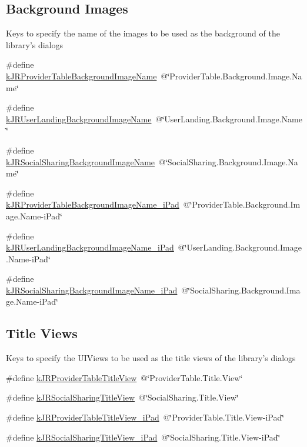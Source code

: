 \subsection*{Background Images}
\label{_amgrp2c0408c2c62eea12966fb29a94739702}
 Keys to specify the name of the images to be used as the background of the library's dialogs \begin{DoxyCompactItemize}
\item 
\#define \hyperlink{group__custom_interface_ga893fb6e20be0c6658e81a6a5d5c121f0}{kJRProviderTableBackgroundImageName}~@\char`\"{}ProviderTable.Background.Image.Name\char`\"{}
\item 
\#define \hyperlink{group__custom_interface_gadda3f945ba5012762eb92764b251b918}{kJRUserLandingBackgroundImageName}~@\char`\"{}UserLanding.Background.Image.Name\char`\"{}
\item 
\#define \hyperlink{group__custom_interface_gad2e00942af19ec9478ba58a491a8b8f2}{kJRSocialSharingBackgroundImageName}~@\char`\"{}SocialSharing.Background.Image.Name\char`\"{}
\item 
\#define \hyperlink{group__custom_interface_ga25b26cff96d8f174f3bdc040031466b7}{kJRProviderTableBackgroundImageName\_\-iPad}~@\char`\"{}ProviderTable.Background.Image.Name-\/iPad\char`\"{}
\item 
\#define \hyperlink{group__custom_interface_ga52b4fb3801cf3fe6e5a294d9a4d1ff0a}{kJRUserLandingBackgroundImageName\_\-iPad}~@\char`\"{}UserLanding.Background.Image.Name-\/iPad\char`\"{}
\item 
\#define \hyperlink{group__custom_interface_ga646cb35f3a7ec2835872ee6df2aceb76}{kJRSocialSharingBackgroundImageName\_\-iPad}~@\char`\"{}SocialSharing.Background.Image.Name-\/iPad\char`\"{}
\end{DoxyCompactItemize}
\subsection*{Title Views}
\label{_amgrp3aa85b42b54fc9202c3d403d77360bef}
 Keys to specify the UIViews to be used as the title views of the library's dialogs \begin{DoxyCompactItemize}
\item 
\#define \hyperlink{group__custom_interface_ga0bce97edf43c9cdf53cbcd1aa92c4798}{kJRProviderTableTitleView}~@\char`\"{}ProviderTable.Title.View\char`\"{}
\item 
\#define \hyperlink{group__custom_interface_ga524965cf426f0eb9de4bcb804528c7f7}{kJRSocialSharingTitleView}~@\char`\"{}SocialSharing.Title.View\char`\"{}
\item 
\#define \hyperlink{group__custom_interface_ga52c322e9fd2aa78cbd64d050f0fd5e41}{kJRProviderTableTitleView\_\-iPad}~@\char`\"{}ProviderTable.Title.View-\/iPad\char`\"{}
\item 
\#define \hyperlink{group__custom_interface_ga2f88062cdd1fd38ad0e800d382450398}{kJRSocialSharingTitleView\_\-iPad}~@\char`\"{}SocialSharing.Title.View-\/iPad\char`\"{}
\end{DoxyCompactItemize}
